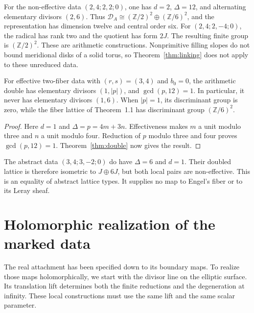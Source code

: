 \documentclass[11pt]{article}
\numberwithin{equation}{section}
\begin{document}
For the non-effective data $(2,4;2,2;0)$, one has
$d=2$, $\Delta=12$, and alternating elementary divisors $(2,6)$.
Thus $\mathcal D_A\cong(\mathbb Z/2)^2\oplus(\mathbb Z/6)^2$,
and the representation has dimension twelve and central order six.
For $(2,4;2,-4;0)$, the radical has rank two and the quotient has
form $2J$.  The resulting finite group is $(\mathbb Z/2)^2$.
These are arithmetic constructions.  Nonprimitive filling slopes do
not bound meridional disks of a solid torus, so Theorem~\ref{thm:linking}
does not apply to these unreduced data.

\begin{proposition}\label{prop:separation}
For effective two-fiber data with $(r,s)=(3,4)$ and $b_0=0$, the
arithmetic double has elementary divisors $(1,|p|)$, and
$\gcd(p,12)=1$.  In particular, it never has elementary divisors
$(1,6)$.  When $|p|=1$, its discriminant group is zero, while the
fiber lattice of Theorem~1.1 has discriminant group $(\mathbb Z/6)^2$.
\end{proposition}

\begin{proof}
Here $d=1$ and $\Delta=p=4m+3n$.
Effectiveness makes $m$ a unit modulo three and $n$ a unit modulo four.
Reduction of $p$ modulo three and four proves $\gcd(p,12)=1$.
Theorem~\ref{thm:double} now gives the result.
\end{proof}

The abstract data $(3,4;3,-2;0)$ do have $\Delta=6$ and $d=1$.
Their doubled lattice is therefore isometric to $J\oplus6J$, but
both local pairs are non-effective.  This is an equality of abstract
lattice types.  It supplies no map to Engel's fiber or to its Leray sheaf.











\section{Holomorphic realization of the marked data}\label{sec:holomorphic-realization}

The real attachment has been specified down to its boundary maps.
To realize those maps holomorphically, we start with the divisor line
on the elliptic surface. Its translation lift determines both the
finite reductions and the degeneration at infinity. These local
constructions must use the same lift and the same scalar parameter.
\end{document}
